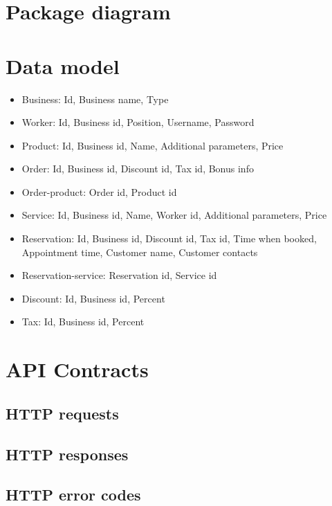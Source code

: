 \documentclass[11pt,a4paper,pdftex]{article}
\begin{document}
\section{Package diagram}

%    
\section{Data model}
\begin{itemize}
    \item Business: Id, Business name, Type 
    \item Worker: Id, Business id, Position, Username, Password
    \item Product: Id, Business id, Name, Additional parameters, Price
    \item Order: Id, Business id, Discount id, Tax id, Bonus info
    \item Order-product: Order id, Product id
    \item Service: Id, Business id, Name, Worker id, Additional parameters, Price
    \item Reservation: Id, Business id, Discount id, Tax id, Time when booked, Appointment time, Customer name, Customer contacts
    \item Reservation-service: Reservation id, Service id
    \item Discount: Id, Business id, Percent
    \item Tax: Id, Business id, Percent
\end{itemize}

\section{API Contracts}
\subsection{HTTP requests}

\subsection{HTTP responses}

\subsection{HTTP error codes}
\end{document}
